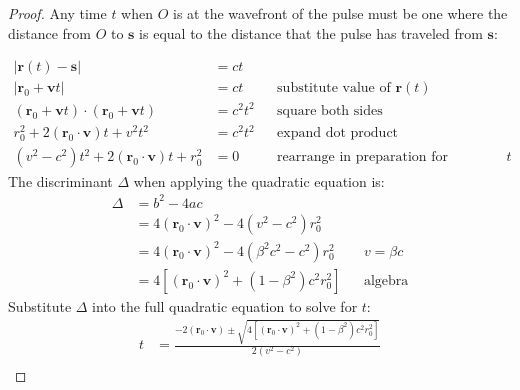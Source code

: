 \documentclass[a4paper]{article}
\theoremstyle{plain}
\theoremstyle{definition}
\newcommand{\vect}[1]{\mathbf{#1}}
\begin{document}
\begin{proof}
Any time $t$ when $O$ is at the wavefront of the pulse must be one
where the distance from $O$ to $\vect{s}$ is equal to the distance
that the pulse has traveled from $\vect{s}$:

\begin{align*}
|\vect{r}(t) - \vect{s}| & = ct \\
|\vect{r}_0 + \vect{v}t| & = ct & & \text{substitute value of $\vect{r}(t)$} \\
(\vect{r}_0 + \vect{v}t) \cdot (\vect{r}_0 + \vect{v}t) & = c^2t^2 & & \text{square both sides} \\
r_0^2 + 2(\vect{r}_0 \cdot \vect{v})t + v^2t^2 & = c^2t^2 & & \text{expand dot product} \\
(v^2-c^2)t^2 + 2(\vect{r}_0 \cdot \vect{v})t + r_0^2 & = 0 & & \text{rearrange in preparation for quadratic equation on $t$}
\end{align*}
The discriminant $\Delta$ when applying the quadratic equation is:
\begin{align*}
\Delta
  & = b^2 - 4ac \\
  & = 4(\vect{r}_0 \cdot \vect{v})^2 - 4(v^2 - c^2)r_0^2 \\
  & = 4(\vect{r}_0 \cdot \vect{v})^2 - 4(\beta^2 c^2 - c^2)r_0^2 & & \text{$v=\beta c$} \\
  & = 4 \left[ (\vect{r}_0 \cdot \vect{v})^2 + (1-\beta^2)c^2 r_0^2 \right] & & \text{algebra}
\end{align*}
Substitute $\Delta$ into the full quadratic equation to solve for $t$:
\begin{align*}
t
  & = \frac{-2(\vect{r}_0 \cdot \vect{v}) \pm \sqrt{4 \left[ (\vect{r}_0 \cdot \vect{v})^2 + (1-\beta^2)c^2 r_0^2 \right]}}{2(v^2 - c^2)} \\

\end{align*}
\end{proof}
\end{document}
